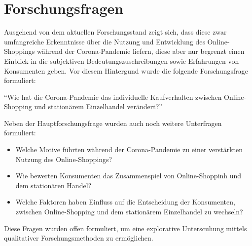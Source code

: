 \section{Forschungsfragen}
Ausgehend von dem aktuellen Forschungsstand zeigt sich, dass diese zwar umfangreiche Erkenntnisse über die Nutzung und Entwicklung des Online-Shoppings während der Corona-Pandemie liefern, diese aber nur begrenzt einen Einblick in die subjektiven Bedeutungszuschreibungen sowie Erfahrungen von Konsumenten geben. Vor diesem Hintergund wurde die folgende Forschungsfrage formuliert:

\enquote{Wie hat die Corona-Pandemie das individuelle Kaufverhalten zwischen Online-Shopping und stationärem Einzelhandel verändert?}

Neben der Hauptforschungsfrage wurden auch noch weitere Unterfragen formuliert:

\begin{itemize}
    \item Welche Motive führten während der Corona-Pandemie zu einer verstärkten Nutzung des Online-Shoppings?
    \item Wie bewerten Konsumenten das Zusammenspiel von Online-Shoppinh und dem stationären Handel?
    \item Welche Faktoren haben Einfluss auf die Entscheidung der Konsumenten, zwischen Online-Shopping und dem stationärem Einzelhandel zu wechseln?
\end{itemize}

Diese Fragen wurden offen formuliert, um eine explorative Unterscuhung mittels qualitativer Forschungsmethoden zu ermöglichen.